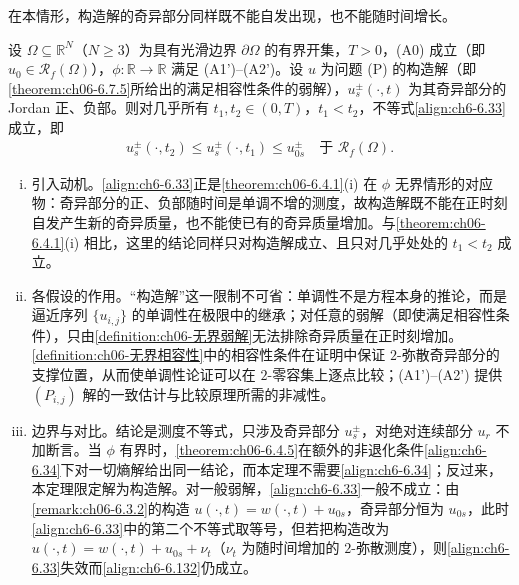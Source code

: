 \documentclass[../../main.tex]{subfiles}%
\begin{document}
在本情形，构造解的奇异部分同样既不能自发出现，也不能随时间增长。

\begin{theorem}\label{theorem:ch06-6.7.7}
设 $\Omega\subseteq\mathbb{R}^N$（$N\geqslant3$）为具有光滑边界 $\partial\Omega$ 的有界开集，$T>0$，(A0) 成立（即 $u_0\in\mathscr{R}_f(\Omega)$），$\phi:\mathbb{R}\to\mathbb{R}$ 满足 (A1')--(A2')。设 $u$ 为问题 (P) 的构造解（即\cref{theorem:ch06-6.7.5}所给出的满足相容性条件的弱解），$u^\pm_s(\cdot,t)$ 为其奇异部分的 Jordan 正、负部。则对几乎所有 $t_1,t_2\in(0,T)$，$t_1<t_2$，不等式\eqref{align:ch6-6.33}成立，即
\begin{align*}
u^\pm_s(\cdot,t_2)\leqslant u^\pm_s(\cdot,t_1)\leqslant u^\pm_{0s}\quad\text{于 }\mathscr{R}_f(\Omega).
\end{align*}
\end{theorem}

\begin{remark}\label{remark:ch06-6.7.7动机}
\begin{enumerate}[(i)]
\item 引入动机。\eqref{align:ch6-6.33}正是\cref{theorem:ch06-6.4.1}(i) 在 $\phi$ 无界情形的对应物：奇异部分的正、负部随时间是单调不增的测度，故构造解既不能在正时刻自发产生新的奇异质量，也不能使已有的奇异质量增加。与\cref{theorem:ch06-6.4.1}(i) 相比，这里的结论同样只对构造解成立、且只对几乎处处的 $t_1<t_2$ 成立。

\item 各假设的作用。“构造解”这一限制不可省：单调性不是方程本身的推论，而是逼近序列 $\{u_{i,j}\}$ 的单调性在极限中的继承；对任意的弱解（即使满足相容性条件），只由\cref{definition:ch06-无界弱解}无法排除奇异质量在正时刻增加。\cref{definition:ch06-无界相容性}中的相容性条件在证明中保证 $2$-弥散奇异部分的支撑位置，从而使单调性论证可以在 $2$-零容集上逐点比较；(A1')--(A2') 提供 $(P_{i,j})$ 解的一致估计与比较原理所需的非减性。

\item 边界与对比。结论是测度不等式，只涉及奇异部分 $u^\pm_s$，对绝对连续部分 $u_r$ 不加断言。当 $\phi$ 有界时，\cref{theorem:ch06-6.4.5}在额外的非退化条件\eqref{align:ch6-6.34}下对一切熵解给出同一结论，而本定理不需要\eqref{align:ch6-6.34}；反过来，本定理限定解为构造解。对一般弱解，\eqref{align:ch6-6.33}一般不成立：由\cref{remark:ch06-6.3.2}的构造 $u(\cdot,t)=w(\cdot,t)+u_{0s}$，奇异部分恒为 $u_{0s}$，此时\eqref{align:ch6-6.33}中的第二个不等式取等号，但若把构造改为 $u(\cdot,t)=w(\cdot,t)+u_{0s}+\nu_t$（$\nu_t$ 为随时间增加的 $2$-弥散测度），则\eqref{align:ch6-6.33}失效而\eqref{align:ch6-6.132}仍成立。
\end{enumerate}
\end{remark}
\end{document}
